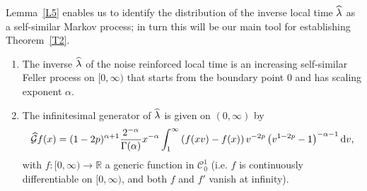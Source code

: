 \documentclass[AHL,Unicode,longabstracts,published]{cedram}
\renewcommand{\hat}[1]{\widehat{#1}}
\newcommand{\dd}{\mathrm{d}}
\newcommand{\R}{\mathbb{R}}
\newcommand{\calC}{\mathcal{C}}
\newcommand{\calG}{\mathcal{G}}
\newcommand*{\romanenumi}{\renewcommand*{\theenumi}{\roman{enumi}}}
\let\oldhat\hat
\renewcommand*{\hat}[1]{\mathchoice{\widehat{#1}}{\widehat{#1}}{\oldhat{#1}}{\oldhat{#1}}}
\begin{document}
Lemma~\ref{L5} enables us to identify the distribution of the inverse local time $\hat \lambda$ as a self-similar Markov process; in turn this will be our main tool for establishing Theorem~\ref{T2}.

\begin{coro}\label{C1}\leavevmode
\begin{enumerate}\romanenumi
\item\label{coro4.2.i} The inverse $\hat \lambda$ of the noise reinforced local time is an increasing self-similar Feller process on $[0,\infty)$ that starts from the boundary point $0$ and has scaling exponent $\alpha$.

\item\label{coro4.2.ii} The infinitesimal generator of $\hat \lambda$ is given on $(0,\infty)$ by
\[
\hat{\calG}f(x) = (1-2p)^{\alpha+1} \frac{2^{-\alpha}}{\Gamma(\alpha)} x^{-\alpha} \int_1^{\infty} \left(f(x v)-f(x)\right) v^{-2p} \left(v^{1-2p}-1\right)^{-\alpha - 1} \dd v,
\]
with $f:[0,\infty)\to \R$ a generic function in $\calC^1_0$ (i.e. $f$ is continuously differentiable on $[0,\infty)$, and both $f$ and $f'$ vanish at infinity).
\end{enumerate}
\end{coro}
\end{document}
